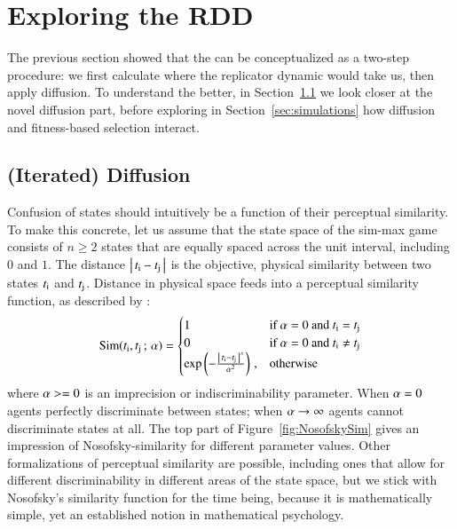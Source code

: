 \section{Exploring the RDD}
\label{sec:exploring-rdd}

The previous section showed that the \rdd can be conceptualized as a
two-step procedure: we first calculate where the replicator dynamic
would take us, then apply diffusion. To understand the \rdd
better, in Section~\ref{sec:iterated-diffusion} we look closer at the novel
diffusion part, before exploring in Section~\ref{sec:simulations} how
diffusion and fitness-based selection interact.

\subsection{(Iterated) Diffusion}
\label{sec:iterated-diffusion}

Confusion of states should intuitively be a function of their
perceptual similarity. To make this concrete, let us assume that the
state space of the sim-max game consists of $n \ge 2$ states that are
equally spaced across the unit interval, including $0$ and $1$. The
distance $\left \lvert \, t_{\mathrm{i}} - t_{\mathrm{j}} \, \right\rvert$ is the objective, physical
similarity between two states $t_{\mathrm{i}}$ and
$t_{\mathrm{j}}$. Distance in physical space feeds into a perceptual
similarity function, as described by
\citet{Nosofsky1986:Attention-Simil}:
\begin{align}
  \label{eq:NosofskySim}
  \mathrm{Sim}(t_{\mathrm{i}}, t_{\mathrm{j}} \thinspace ; \thinspace \alpha) =
      \begin{cases}
    1 & \textrm{if } \alpha = 0 \textrm{ and } t_{\mathrm{i}} = t_{\mathrm{j}} \\
    0 & \textrm{if } \alpha = 0 \textrm{ and } t_{\mathrm{i}} \neq t_{\mathrm{j}} \\
 \operatorname{exp} \left ( -  \frac{\left \lvert \, t_{\mathrm{i}} - t_{\mathrm{j}} \, \right\rvert^s}{ \alpha^2} \right ) \,,& \textrm{otherwise} \\
    \end{cases}
\end{align}
where $\alpha >= 0$ is an imprecision or indiscriminability
parameter. When $\alpha=0$ agents perfectly discriminate between
states; when $\alpha \rightarrow \infty$ agents cannot
discriminate states at all. The top part of
Figure~\ref{fig:NosofskySim} gives an impression of
Nosofsky-similarity for different parameter values. Other
formalizations of perceptual similarity are possible, including ones
that allow for different discriminability in different areas of the
state space, but we stick with Nosofsky's similarity function for the
time being, because it is mathematically simple, yet an established
notion in mathematical psychology.

